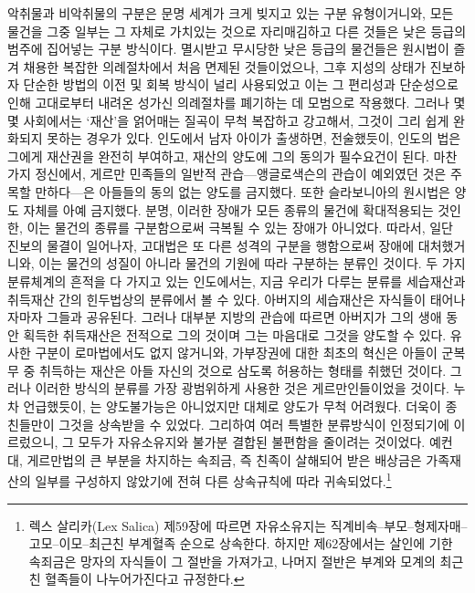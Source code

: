 악취물과 비악취물의 구분은 문명 세계가 크게 빚지고 있는 구분 유형이거니와,
모든 물건을 그중 일부는 그 자체로 가치있는 것으로 자리매김하고
다른 것들은 낮은 등급의 범주에 집어넣는 구분 방식이다.
멸시받고 무시당한
낮은 등급의 물건들은
원시법이 즐겨 채용한 복잡한 의례절차에서 처음 면제된 것들이었으나,
그후 지성의 상태가 진보하자
단순한 방법의 이전 및 회복 방식이 널리 사용되었고 이는
그 편리성과 단순성으로 인해
고대로부터 내려온 성가신 의례절차를 폐기하는 데 모범으로 작용했다.
그러나 몇몇 사회에서는
`재산'을 얽어매는 질곡이 무척 복잡하고 강고해서,
그것이 그리 쉽게 완화되지 못하는 경우가 있다.
인도에서 남자 아이가 출생하면,
전술했듯이,
인도의 법은 그에게 재산권을 완전히 부여하고,
재산의 양도에 그의 동의가 필수요건이 된다.
마찬가지 정신에서,
게르만 민족들의 일반적 관습---앵글로색슨의 관습이 예외였던 것은
주목할 만하다---은
아들들의 동의 없는 양도를 금지했다.
또한 슬라보니아의 원시법은 양도 자체를 아예 금지했다.
분명, 이러한 장애가
모든 종류의 물건에 확대적용되는 것인 한, 이는
물건의 종류를 구분함으로써 극복될 수 있는 장애가 아니었다.
따라서, 일단 진보의 물결이 일어나자,
고대법은 또 다른 성격의 구분을 행함으로써 장애에 대처했거니와,
이는 물건의 성질이 아니라 물건의 기원에 따라 구분하는 분류인 것이다.
두 가지 분류체계의 흔적을 다 가지고 있는
인도에서는, 지금 우리가 다루는 분류를
세습재산과
취득재산 간의 힌두법상의 분류에서 볼 수 있다.
아버지의 세습재산은 자식들이 태어나자마자 그들과 공유된다.
그러나 대부분 지방의 관습에 따르면
아버지가 그의 생애 동안 획득한 취득재산은 전적으로 그의 것이며
그는 마음대로 그것을 양도할 수 있다.
유사한 구분이 로마법에서도 없지 않거니와,
가부장권에 대한 최초의 혁신은
아들이 군복무 중 취득하는 재산은 아들 자신의 것으로 삼도록
허용하는 형태를 취했던 것이다.
그러나 이러한 방식의 분류를 가장 광범위하게 사용한 것은
게르만인들이었을 것이다.
누차 언급했듯이,
는 양도불가능은 아니었지만
대체로 양도가 무척 어려웠다.
더욱이 종친들만이 그것을 상속받을 수 있었다.
그리하여 여러 특별한 분류방식이 인정되기에 이르렀으니,
그 모두가 자유소유지와 불가분 결합된 불편함을 줄이려는 것이었다.
예컨대,
게르만법의 큰 부분을 차지하는
속죄금, 즉
친족이 살해되어 받은 배상금은
가족재산의 일부를 구성하지 않았기에
전혀 다른 상속규칙에 따라 귀속되었다.\footnote{%
  렉스 살리카(Lex Salica) 제59장에 따르면 자유소유지는
  직계비속--부모--형제자매--고모--이모--최근친 부계혈족 순으로 상속한다.
  하지만 제62장에서는
  살인에 기한 속죄금은 망자의 자식들이 그 절반을 가져가고,
  나머지 절반은 부계와 모계의 최근친 혈족들이 나누어가진다고 규정한다. }
